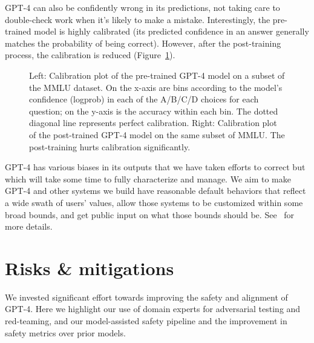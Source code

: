 \documentclass{article}
\begin{document}
GPT-4 can also be confidently wrong in its predictions, not taking care to double-check work when it’s likely to make a mistake. Interestingly, the pre-trained model is highly calibrated (its predicted confidence in an answer generally matches the probability of being correct). However, after the post-training process, the calibration is reduced (Figure~\ref{fig:calibration}).

\begin{figure}[htbp]
    \centering
    \caption{Left: Calibration plot of the pre-trained GPT-4 model on a subset of the MMLU dataset. On the x-axis are bins according to the model’s confidence (logprob) in each of the A/B/C/D choices for each question; on the y-axis is the accuracy within each bin. The dotted diagonal line represents perfect calibration. Right: Calibration plot of the post-trained GPT-4 model on the same subset of MMLU. The post-training hurts calibration significantly.}
    \label{fig:calibration}
\end{figure}

GPT-4 has various biases in its outputs that we have taken efforts to correct but which will take some time to fully characterize and manage. 
We aim to make GPT-4 and other systems we build have reasonable default behaviors that reflect a wide swath of users’ values, allow those systems to be customized within some broad bounds, and get public input on what those bounds should be. See~\citet{openaibehaveblog} for more details.








\section{Risks \& mitigations}



We invested significant effort towards improving the safety and alignment of GPT-4. Here we highlight our use of domain experts for adversarial testing and red-teaming, and our model-assisted safety pipeline \citep{openaialignmentblog}
and the improvement in safety metrics over prior models. 
\end{document}
